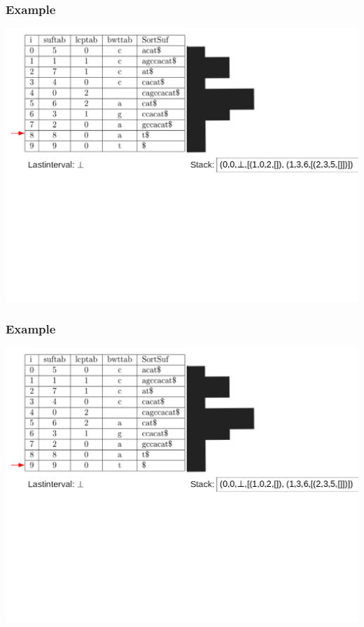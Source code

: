 \documentclass[compress,handout]{beamer} %
\begin{document}
\begin{frame}
	\frametitle{Example}
	\includegraphics[width=\textwidth, height=\textheight, keepaspectratio=true]{traversal_13}
\end{frame}

\begin{frame}
	\frametitle{Example}
	\includegraphics[width=\textwidth, height=\textheight, keepaspectratio=true]{traversal_14}
\end{frame}
\end{document}
